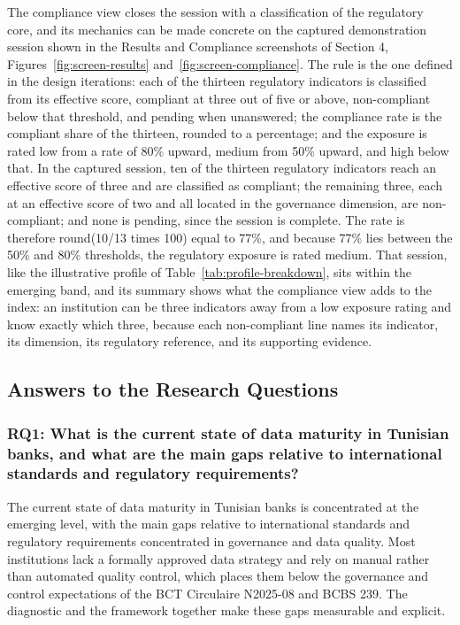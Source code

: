 The compliance view closes the session with a classification of the regulatory core, and its mechanics can be made concrete on the captured demonstration session shown in the Results and Compliance screenshots of Section 4, Figures~\ref{fig:screen-results} and~\ref{fig:screen-compliance}. The rule is the one defined in the design iterations: each of the thirteen regulatory indicators is classified from its effective score, compliant at three out of five or above, non-compliant below that threshold, and pending when unanswered; the compliance rate is the compliant share of the thirteen, rounded to a percentage; and the exposure is rated low from a rate of 80\% upward, medium from 50\% upward, and high below that. In the captured session, ten of the thirteen regulatory indicators reach an effective score of three and are classified as compliant; the remaining three, each at an effective score of two and all located in the governance dimension, are non-compliant; and none is pending, since the session is complete. The rate is therefore round(10/13 times 100) equal to 77\%, and because 77\% lies between the 50\% and 80\% thresholds, the regulatory exposure is rated medium. That session, like the illustrative profile of Table~\ref{tab:profile-breakdown}, sits within the emerging band, and its summary shows what the compliance view adds to the index: an institution can be three indicators away from a low exposure rating and know exactly which three, because each non-compliant line names its indicator, its dimension, its regulatory reference, and its supporting evidence.

\subsection{Answers to the Research Questions}

\subsubsection{RQ1: What is the current state of data maturity in Tunisian banks, and what are the main gaps relative to international standards and regulatory requirements?}

The current state of data maturity in Tunisian banks is concentrated at the emerging level, with the main gaps relative to international standards and regulatory requirements concentrated in governance and data quality. Most institutions lack a formally approved data strategy and rely on manual rather than automated quality control, which places them below the governance and control expectations of the BCT Circulaire N\textdegree{}2025-08 and BCBS 239. The diagnostic and the framework together make these gaps measurable and explicit.

